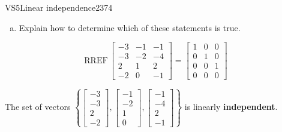 \begin{exercise}{VS5}{Linear independence}{2374}
\begin{exerciseStatement}
\begin{enumerate}[(a)]
     
\item  

 Explain how to determine which of these statements is true. 

 
\end{enumerate}

     \end{exerciseStatement}
 \begin{exerciseAnswer} 

 \[
\mathrm{RREF}\, \left[\begin{array}{ccc}
-3 & -1 & -1 \\
-3 & -2 & -4 \\
2 & 1 & 2 \\
-2 & 0 & -1
\end{array}\right] = \left[\begin{array}{ccc}
1 & 0 & 0 \\
0 & 1 & 0 \\
0 & 0 & 1 \\
0 & 0 & 0
\end{array}\right]
            \] 

 

 The set of vectors \(\left\{ \left[\begin{array}{c}
-3 \\
-3 \\
2 \\
-2
\end{array}\right] , \left[\begin{array}{c}
-1 \\
-2 \\
1 \\
0
\end{array}\right] , \left[\begin{array}{c}
-1 \\
-4 \\
2 \\
-1
\end{array}\right] \right\}\) is linearly \textbf{independent}. 

 \end{exerciseAnswer}
 \end{exercise}


